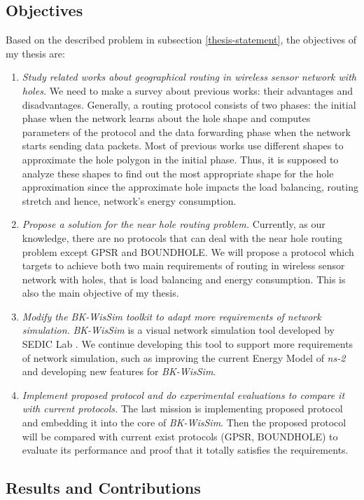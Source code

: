 \subsection{Objectives}
Based on the described problem in subsection \ref{thesis-statement}, the objectives of my thesis are:
\begin{enumerate}
\item \emph{Study related works about geographical routing in wireless sensor network with holes.} We need to make a survey about previous works: their advantages and disadvantages. Generally, a routing protocol consists of two phases: the initial phase when the network learns about the hole shape and computes parameters of the protocol and the data forwarding phase when the network starts sending data packets. Most of previous works use different shapes to approximate the hole polygon in the initial phase. Thus, it is supposed to analyze these shapes to find out the most appropriate shape for the hole approximation since the approximate hole impacts the load balancing, routing stretch and hence, network's energy consumption.
\item \emph{Propose a solution for the near hole routing problem.} Currently, as our knowledge, there are no protocols that can deal with the near hole routing problem except GPSR and BOUNDHOLE. We will propose a protocol which targets to achieve both two main requirements of routing in wireless sensor network with holes, that is load balancing and energy consumption. This is also the main objective of my thesis.
\item \emph{Modify the BK-WisSim toolkit to adapt more requirements of network simulation.} \emph{BK-WisSim} is a visual network simulation tool developed by SEDIC Lab \cite{wissim-web}. We continue developing this tool to support more requirements of network simulation, such as improving the current Energy Model of \emph{ns-2} and developing new features for \emph{BK-WisSim}.
\item \emph{Implement proposed protocol and do experimental evaluations to compare it with current protocols.} The last mission is implementing proposed protocol and embedding it into the core of \emph{BK-WisSim}. Then the proposed protocol will be compared with current exist protocols (GPSR, BOUNDHOLE) to evaluate its performance and proof that it totally satisfies the requirements.
\end{enumerate}

\subsection{Results and Contributions}
